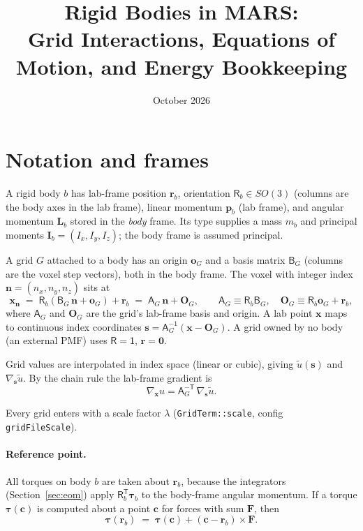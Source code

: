 \documentclass[11pt]{article}
\title{Rigid Bodies in MARS:\\Grid Interactions, Equations of Motion, and Energy Bookkeeping}
\date{October 2026}
\newcommand{\vb}[1]{\bm{#1}}
\newcommand{\code}[1]{\texttt{#1}}
\begin{document}
\maketitle

\section{Notation and frames}

A rigid body $b$ has lab-frame position $\vb r_b$, orientation
$\mathsf R_b\in SO(3)$ (columns are the body axes in the lab frame), linear
momentum $\vb p_b$ (lab frame), and angular momentum $\vb L_b$ stored in the
\emph{body} frame. Its type supplies a mass $m_b$ and principal moments
$\vb I_b=(I_x,I_y,I_z)$; the body frame is assumed principal.

A grid $G$ attached to a body has an origin $\vb o_G$ and a basis matrix
$\mathsf B_G$ (columns are the voxel step vectors), both in the body frame. The
voxel with integer index $\vb n=(n_x,n_y,n_z)$ sits at
\begin{equation}
  \vb x_{\vb n} \;=\; \mathsf R_b\left(\mathsf B_G\,\vb n + \vb o_G\right) + \vb r_b
  \;=\; \mathsf A_G\,\vb n + \vb O_G,
  \qquad
  \mathsf A_G \equiv \mathsf R_b\mathsf B_G,\quad
  \vb O_G \equiv \mathsf R_b\vb o_G + \vb r_b ,
  \label{eq:voxel}
\end{equation}
where $\mathsf A_G$ and $\vb O_G$ are the grid's lab-frame basis and origin.
A lab point $\vb x$ maps to continuous index coordinates
$\vb s = \mathsf A_G^{-1}(\vb x-\vb O_G)$. A grid owned by no body (an external
PMF) uses $\mathsf R=\mathsf 1$, $\vb r=\vb 0$.

Grid values are interpolated in index space (linear or cubic), giving
$\tilde u(\vb s)$ and $\nabla_{\vb s}\tilde u$. By the chain rule the
lab-frame gradient is
\begin{equation}
  \nabla_{\vb x} u = \mathsf A_G^{-\mathsf T}\,\nabla_{\vb s}\tilde u .
  \label{eq:chain}
\end{equation}

Every grid enters with a scale factor $\lambda$ (\code{GridTerm::scale},
config \code{gridFileScale}).

\paragraph{Reference point.} All torques on body $b$ are taken about
$\vb r_b$, because the integrators (Section~\ref{sec:eom}) apply
$\mathsf R_b^{\mathsf T}\vb\tau_b$ to the body-frame angular momentum. If a
torque $\vb\tau(\vb c)$ is computed about a point $\vb c$ for forces with sum
$\vb F$, then
\begin{equation}
  \vb\tau(\vb r_b) \;=\; \vb\tau(\vb c) + (\vb c-\vb r_b)\times\vb F .
  \label{eq:shift}
\end{equation}
\end{document}
